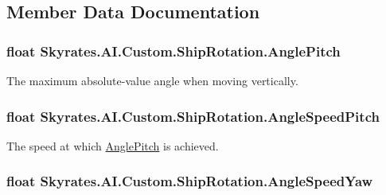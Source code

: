 \subsection{Member Data Documentation}
\hypertarget{class_skyrates_1_1_a_i_1_1_custom_1_1_ship_rotation_a3c427f9a37774bca1736f3f74db91f89}{
\subsubsection[{Angle\-Pitch}]{\setlength{\rightskip}{0pt plus 5cm}float Skyrates.\-A\-I.\-Custom.\-Ship\-Rotation.\-Angle\-Pitch}}\label{class_skyrates_1_1_a_i_1_1_custom_1_1_ship_rotation_a3c427f9a37774bca1736f3f74db91f89}


The maximum absolute-\/value angle when moving vertically. 

\hypertarget{class_skyrates_1_1_a_i_1_1_custom_1_1_ship_rotation_af966fbfe16e1f411288a8681d99b2d08}{
\subsubsection[{Angle\-Speed\-Pitch}]{\setlength{\rightskip}{0pt plus 5cm}float Skyrates.\-A\-I.\-Custom.\-Ship\-Rotation.\-Angle\-Speed\-Pitch}}\label{class_skyrates_1_1_a_i_1_1_custom_1_1_ship_rotation_af966fbfe16e1f411288a8681d99b2d08}


The speed at which \hyperlink{class_skyrates_1_1_a_i_1_1_custom_1_1_ship_rotation_a3c427f9a37774bca1736f3f74db91f89}{Angle\-Pitch} is achieved. 

\hypertarget{class_skyrates_1_1_a_i_1_1_custom_1_1_ship_rotation_a35320a27fe52da777b3cf343f2b879b2}{
\subsubsection[{Angle\-Speed\-Yaw}]{\setlength{\rightskip}{0pt plus 5cm}float Skyrates.\-A\-I.\-Custom.\-Ship\-Rotation.\-Angle\-Speed\-Yaw}}\label{class_skyrates_1_1_a_i_1_1_custom_1_1_ship_rotation_a35320a27fe52da777b3cf343f2b879b2}


